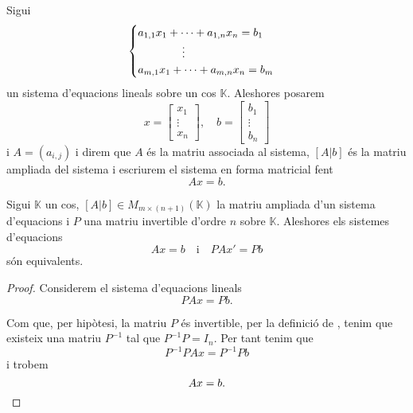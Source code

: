 \documentclass[../Apunts.tex]{subfiles}
\begin{document}
	\begin{notation}
		Sigui
		\begin{equation}
		\begin{cases}
		a_{1,1}x_{1}+\dots+a_{1,n}x_{n}=b_{1}\\
		\hfill\vdots\hfill\hfill\\
		a_{m,1}x_{1}+\dots+a_{m,n}x_{n}=b_{m}
		\end{cases}
		\end{equation}
		un sistema d'equacions lineals sobre un cos \(\mathbb{K}\). Aleshores posarem
		\[x=\left[\begin{matrix}
		x_{1} \\
		\vdots \\
		x_{n}
		\end{matrix}\right],\quad b=\left[\begin{matrix}
		b_{1} \\
		\vdots \\
		b_{n}
		\end{matrix}\right]\]
		i \(A=(a_{i,j})\) i direm que \(A\) és la matriu associada al sistema, \(\left[A\vert b\right]\) és la matriu ampliada del sistema i escriurem el sistema en forma matricial fent
		\[Ax=b.\]
	\end{notation}
	\begin{theorem}
		Sigui \(\mathbb{K}\) un cos, \(\left[A\vert b\right]\in M_{m\times(n+1)}(\mathbb{K})\) la matriu ampliada d'un sistema d'equacions i \(P\) una matriu invertible d'ordre \(n\) sobre \(\mathbb{K}\). Aleshores els sistemes d'equacions
		\[Ax=b\quad\text{i}\quad PAx'=Pb\]
		són equivalents.
		\begin{proof} %
			Considerem el sistema d'equacions lineals
			\[PAx=Pb.\]
			
			Com que, per hipòtesi, la matriu \(P\) és invertible, per la definició de , tenim que existeix una matriu \(P^{-1}\) tal que \(P^{-1}P=I_{n}\). Per tant tenim que
			\[P^{-1}PAx=P^{-1}Pb\]
			i trobem
			\[Ax=b.\qedhere\]
		\end{proof}
	\end{theorem}
\end{document}
